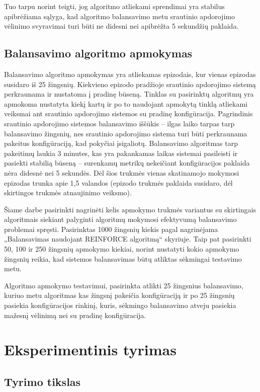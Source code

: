 \documentclass{VUMIFPSbakalaurinis}
\begin{document}
Tuo tarpu norint teigti, jog algoritmo atliekami sprendimai yra stabilus apibrėžiama sąlyga, kad algoritmo balansavimo metu srautinio apdorojimo vėlinimo svyravimai turi būti ne didesni nei apibrėžta 5 sekundžių paklaida. 

\subsection{Balansavimo algoritmo apmokymas}

Balansavimo algoritmo apmokymas yra atliekamas epizodais, kur vienas epizodas susidaro iš 25 žingsnių. Kiekvieno epizodo pradžioje srautinio apdorojimo sistemą perkraunama ir nustatoma į pradinę būseną. Tinklas su pasirinktų algoritmų yra apmokoma nustatyta kiekį kartų ir po to naudojant apmokytą tinklą atliekami veiksmai ant srautinio apdorojimo sistemos su pradinę konfigūracija. Pagrindinis srautinio apdorojimo sistemos balansavimo iššūkis – ilgas laiko tarpas tarp balansavimo žingsnių, nes srautinio apdorojimo sistema turi būti perkraunama pakeitus konfigūraciją, kad pokyčiai įsigaliotų. Balansavimo algoritmas tarp pakeitimų laukia 3 minutes, kas yra pakankamas laikas sistemai pasileisti ir pasiekti stabilią būseną – surenkamų metrikų nekeičiant konfigūracijos paklaida nėra didesnė nei 5 sekundės. Dėl šios trukmės vienas skatinamojo mokymosi epizodas trunka apie 1,5 valandos (epizodo trukmės paklaida susidaro, dėl skirtingos trukmės atnaujinimo veiksmo). 

Šiame darbe pasirinkti nagrinėti kelis apmokymo trukmės variantus su skirtingais algoritmais siekiant palyginti algoritmų mokymosi efektyvumą balansavimo problemai spręsti. Pasirinktas 1000 žingsnių kiekis pagal \cite{vaquero2018autotuning} nagrinėjama „Balansavimas naudojant REINFORCE algoritmą“ skyriuje. Taip pat pasirinkti 50, 100 ir 250 žingsnių apmokymo kiekiai, norint nustatyti kokio apmokymo žingsnių reikia, kad sistemos balansavimas būtų atliktas sėkmingai testavimo metu.

Algoritmo apmokymo testavimui, pasirinkta atlikti 25 žingsnius balansavimo, kuriuo metu algoritmas kas žingsnį pakeičia konfigūraciją ir po 25 žingsnių pasiekia konfigūracijos rinkinį, kuris, sėkmingo balansavimo atveju pasiekia mažesnį vėlinimą nei su pradinę konfigūracija.
\section{Eksperimentinis tyrimas}

\subsection{Tyrimo tikslas}
\end{document}
